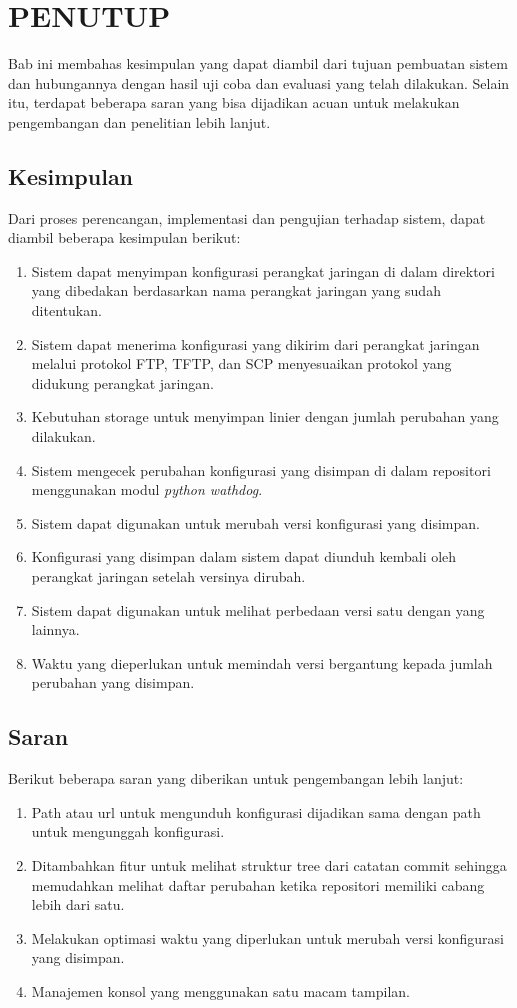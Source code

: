 \chapter{PENUTUP}
    Bab ini membahas kesimpulan yang dapat diambil dari tujuan pembuatan sistem dan hubungannya dengan hasil uji coba dan evaluasi yang telah dilakukan. Selain itu, terdapat beberapa saran yang bisa dijadikan acuan untuk melakukan pengembangan dan penelitian lebih lanjut.
        
	\section{Kesimpulan}
        Dari proses perencangan, implementasi dan pengujian terhadap sistem, dapat diambil beberapa kesimpulan berikut:
		\begin{enumerate}
			\item Sistem dapat menyimpan konfigurasi perangkat jaringan di dalam direktori yang dibedakan berdasarkan nama perangkat jaringan yang sudah ditentukan.
			\item Sistem dapat menerima konfigurasi yang dikirim dari perangkat jaringan melalui protokol FTP, TFTP, dan SCP menyesuaikan protokol yang didukung perangkat jaringan.
            \item Kebutuhan storage untuk menyimpan linier dengan jumlah perubahan yang dilakukan.
            \item Sistem mengecek perubahan konfigurasi yang disimpan di dalam repositori menggunakan modul \textit{python wathdog}.
            \item Sistem dapat digunakan untuk merubah versi konfigurasi yang disimpan.
            \item Konfigurasi yang disimpan dalam sistem dapat diunduh kembali oleh perangkat jaringan setelah versinya dirubah.
            \item Sistem dapat digunakan untuk melihat perbedaan versi satu dengan yang lainnya.
            \item Waktu yang dieperlukan untuk memindah versi bergantung kepada jumlah perubahan yang disimpan.
		\end{enumerate}
        
	\section{Saran}
		Berikut beberapa saran yang diberikan untuk pengembangan lebih lanjut:
		\begin{enumerate}
			\item Path atau url untuk mengunduh konfigurasi dijadikan sama dengan path untuk mengunggah konfigurasi.
			\item Ditambahkan fitur untuk melihat struktur tree dari catatan commit sehingga memudahkan melihat daftar perubahan ketika repositori memiliki cabang lebih dari satu.
			\item Melakukan optimasi waktu yang diperlukan untuk merubah versi konfigurasi yang disimpan.
			\item Manajemen konsol yang menggunakan satu macam tampilan.
		\end{enumerate}